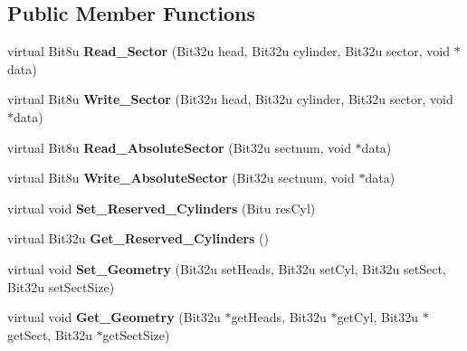 \subsection*{Public Member Functions}
\begin{DoxyCompactItemize}
\item 
\hypertarget{classimageDisk_a71b3de50041c8f3b96acec2d10641ff2}{virtual Bit8u {\bfseries Read\-\_\-\-Sector} (Bit32u head, Bit32u cylinder, Bit32u sector, void $\ast$data)}\label{classimageDisk_a71b3de50041c8f3b96acec2d10641ff2}

\item 
\hypertarget{classimageDisk_a9323c05882bf92d44e66e7e4ed925148}{virtual Bit8u {\bfseries Write\-\_\-\-Sector} (Bit32u head, Bit32u cylinder, Bit32u sector, void $\ast$data)}\label{classimageDisk_a9323c05882bf92d44e66e7e4ed925148}

\item 
\hypertarget{classimageDisk_ae9120b70c021262b85e3db96f7100113}{virtual Bit8u {\bfseries Read\-\_\-\-Absolute\-Sector} (Bit32u sectnum, void $\ast$data)}\label{classimageDisk_ae9120b70c021262b85e3db96f7100113}

\item 
\hypertarget{classimageDisk_ad3d0e6c55d5511902fd16402851a5962}{virtual Bit8u {\bfseries Write\-\_\-\-Absolute\-Sector} (Bit32u sectnum, void $\ast$data)}\label{classimageDisk_ad3d0e6c55d5511902fd16402851a5962}

\item 
\hypertarget{classimageDisk_a3aadaa8e63427e74072b9af40f1c1976}{virtual void {\bfseries Set\-\_\-\-Reserved\-\_\-\-Cylinders} (Bitu res\-Cyl)}\label{classimageDisk_a3aadaa8e63427e74072b9af40f1c1976}

\item 
\hypertarget{classimageDisk_a725dcaa170dba2b9895fa0c3c56df363}{virtual Bit32u {\bfseries Get\-\_\-\-Reserved\-\_\-\-Cylinders} ()}\label{classimageDisk_a725dcaa170dba2b9895fa0c3c56df363}

\item 
\hypertarget{classimageDisk_a042237c8931cc681960e5eb19e6dc45f}{virtual void {\bfseries Set\-\_\-\-Geometry} (Bit32u set\-Heads, Bit32u set\-Cyl, Bit32u set\-Sect, Bit32u set\-Sect\-Size)}\label{classimageDisk_a042237c8931cc681960e5eb19e6dc45f}

\item 
\hypertarget{classimageDisk_a0af6f2540953debaf43c20d5a597562b}{virtual void {\bfseries Get\-\_\-\-Geometry} (Bit32u $\ast$get\-Heads, Bit32u $\ast$get\-Cyl, Bit32u $\ast$get\-Sect, Bit32u $\ast$get\-Sect\-Size)}\label{classimageDisk_a0af6f2540953debaf43c20d5a597562b}


\end{DoxyCompactItemize}
